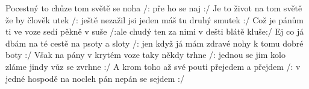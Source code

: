 \begin{TEXT}{Pocestný}
\SLOKA {} to chůze  tom světě  se noha  \NL
/:  pře  ho  se naj  :/ 
\SLOKA Je to život na tom světě že by člověk utek \NL
/: ještě nezažil jsi jeden máš tu druhý smutek :/ 
\SLOKA Což je pánům ti ve voze sedí pěkně v suše \NL
/:ale chudý ten za nimi v dešti blátě kluše:/ 
\SLOKA Ej co já dbám na té cestě na psoty a sloty \NL
/: jen když já mám zdravé nohy k tomu dobré boty :/ 
\SLOKA Však na pány v krytém voze taky někdy trhne \NL
/: jednou se jim kolo zláme jindy vůz se zvrhne :/ 
\SLOKA A krom toho až své pouti přejedem a přejdem \NL
/: v jedné hospodě na nocleh pán nepán se sejdem :/ \NL
\end{TEXT}
